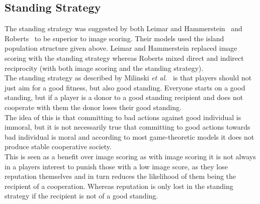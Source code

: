 \documentclass[twoside,twocolumn]{article}
\begin{document}
\subsection{Standing Strategy}
The standing strategy was suggested by both Leimar and Hammerstein~\cite{leimarhammer} and Roberts~\cite{evoldirindir} to be superior to image scoring. Their models used the island population structure given above. Leimar and Hammerstein replaced image scoring with the standing strategy whereas Roberts mixed direct and indirect reciprocity (with both image scoring and the standing strategy).\\
The standing strategy as described by Milinski \textit{et al.}~\cite{imagevsstanding} is that players should not just aim for a good fitness, but also good standing. Everyone starts on a good standing, but if a player is a donor to a good standing recipient and does not cooperate with them the donor loses their good standing.\\
The idea of this is that committing to bad actions against good individual is immoral, but it is not necessarily true that committing to good actions towards bad individual is moral and according to most game-theoretic models it does not produce stable cooperative society.\\
This is seen as a benefit over image scoring as with image scoring it is not always in a players interest to punish those with a low image score, as they lose reputation themselves and in turn reduces the likelihood of them being the recipient of a cooperation. Whereas reputation is only lost in the standing strategy if the recipient is not of a good standing.
\end{document}
